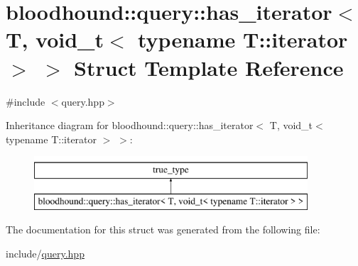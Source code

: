 \hypertarget{structbloodhound_1_1query_1_1has__iterator_3_01T_00_01void__t_3_01typename_01T_1_1iterator_01_4_01_4}{}\section{bloodhound\+:\+:query\+:\+:has\+\_\+iterator$<$ T, void\+\_\+t$<$ typename T\+:\+:iterator $>$ $>$ Struct Template Reference}
\label{structbloodhound_1_1query_1_1has__iterator_3_01T_00_01void__t_3_01typename_01T_1_1iterator_01_4_01_4}


{\ttfamily \#include $<$query.\+hpp$>$}

Inheritance diagram for bloodhound\+:\+:query\+:\+:has\+\_\+iterator$<$ T, void\+\_\+t$<$ typename T\+:\+:iterator $>$ $>$\+:\begin{figure}[H]
\begin{center}
\leavevmode
\includegraphics[height=2.000000cm]{structbloodhound_1_1query_1_1has__iterator_3_01T_00_01void__t_3_01typename_01T_1_1iterator_01_4_01_4}
\end{center}
\end{figure}


The documentation for this struct was generated from the following file\+:\begin{DoxyCompactItemize}
\item 
include/\mbox{\hyperlink{query_8hpp}{query.\+hpp}}\end{DoxyCompactItemize}
